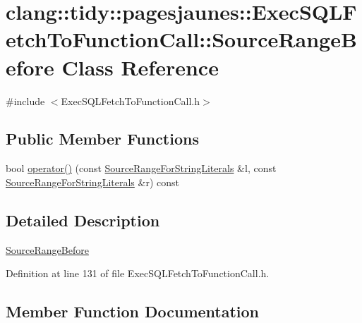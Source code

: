 \hypertarget{classclang_1_1tidy_1_1pagesjaunes_1_1_exec_s_q_l_fetch_to_function_call_1_1_source_range_before}{}\section{clang\+:\+:tidy\+:\+:pagesjaunes\+:\+:Exec\+S\+Q\+L\+Fetch\+To\+Function\+Call\+:\+:Source\+Range\+Before Class Reference}
\label{classclang_1_1tidy_1_1pagesjaunes_1_1_exec_s_q_l_fetch_to_function_call_1_1_source_range_before}


{\ttfamily \#include $<$Exec\+S\+Q\+L\+Fetch\+To\+Function\+Call.\+h$>$}

\subsection*{Public Member Functions}
\begin{DoxyCompactItemize}
\item 
bool \hyperlink{classclang_1_1tidy_1_1pagesjaunes_1_1_exec_s_q_l_fetch_to_function_call_1_1_source_range_before_ab1998eb0ee02677b6143d68b8245ec58}{operator()} (const \hyperlink{classclang_1_1tidy_1_1pagesjaunes_1_1_exec_s_q_l_fetch_to_function_call_1_1_source_range_for_string_literals}{Source\+Range\+For\+String\+Literals} \&l, const \hyperlink{classclang_1_1tidy_1_1pagesjaunes_1_1_exec_s_q_l_fetch_to_function_call_1_1_source_range_for_string_literals}{Source\+Range\+For\+String\+Literals} \&r) const
\end{DoxyCompactItemize}


\subsection{Detailed Description}
\hyperlink{classclang_1_1tidy_1_1pagesjaunes_1_1_exec_s_q_l_fetch_to_function_call_1_1_source_range_before}{Source\+Range\+Before} 

Definition at line 131 of file Exec\+S\+Q\+L\+Fetch\+To\+Function\+Call.\+h.



\subsection{Member Function Documentation}
\mbox{\label{classclang_1_1tidy_1_1pagesjaunes_1_1_exec_s_q_l_fetch_to_function_call_1_1_source_range_before_ab1998eb0ee02677b6143d68b8245ec58}} 
